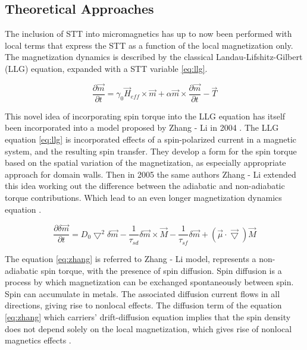 \subsection{Theoretical Approaches}

The inclusion of STT into micromagnetics has up to now been performed with local terms that express the STT as a function of the local magnetization only. The magnetization dynamics is described by the classical Landau-Lifshitz-Gilbert (LLG) equation, expanded with a STT variable \ref{eq:llg}.

\begin{equation}  \label{eq:llg}
	\frac{\partial \vec{m}}{\partial t} = \gamma_0\vec{H}_{eff} \times \vec{m} + \alpha \vec{m} \times \frac{\partial \vec{m}}{\partial t} - \vec{T}
\end{equation}

This novel idea of incorporating spin torque into the LLG equation has itself been incorporated into a model proposed by Zhang - Li in 2004 \cite{zhang2004}. The LLG equation \ref{eq:llg} is incorporated effects of a spin-polarized current in a magnetic system, and the resulting spin transfer. They develop a form for the spin torque based on the spatial variation of the magnetization, as especially appropriate approach for domain walls. Then in 2005 the same authors Zhang - Li extended this idea working out the difference between the adiabatic and non-adiabatic torque contributions. Which lead to an even longer magnetization dynamics equation \cite{zhang} \cite{spindomain}.

\begin{equation} \label{eq:zhang}
 \frac{\partial \delta \vec{m} }{\partial t} =  D_{0}\bigtriangledown^{2} \delta \vec{m} - \frac{1}{\tau_{sd}} \delta \vec{m} \times \vec{M} - \frac{1}{\tau_{sf}}\delta \vec{m} +(\vec{\mu} \cdot\vec{\bigtriangledown} )\vec{M}
\end{equation}

The equation \ref{eq:zhang} is referred to Zhang - Li model, represents a non-adiabatic spin torque, with the presence of spin diffusion. Spin diffusion is a process by which magnetization can be exchanged spontaneously between spin. Spin can accumulate in metals. The associated diffusion current flows in all directions, giving rise to nonlocal effects. The diffusion term of the equation \ref{eq:zhang} which carriers’  drift-diffusion equation implies that the spin density does not depend solely on the local magnetization, which gives rise of nonlocal magnetics effects \cite{claudio}. 


